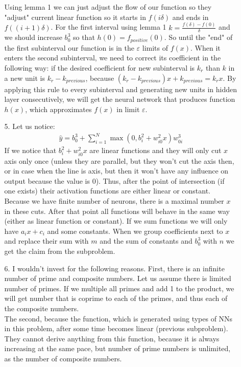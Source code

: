 \documentclass[10pt,a4paper]{article}
\begin{document}
\begin{enumerate}
\begin{enumerate}
Using lemma 1 we can just adjust the flow of our function so they "adjust" current linear function so it starts in $f(i\delta)$ and ends in $f((i+1)\delta)$.
For the first interval using lemma 1 $k = \frac{f(\delta) - f(0)}{\delta}$ and we should increase $b_0^3$ so that $h(0)=f_{positive}(0)$. So until the "end" of the first subinterval our function is in the $\varepsilon$ limits of $f(x)$. When it enters the second subinterval, we need to correct its coefficient in the following way:
if the desired coefficient for new subinterval is $k_r$ than $k$ in a new unit is $k_r - k_{previous}$, because 
$(k_r - k_{previous})x + k_{previous} = k_rx $. 
By applying this rule to every subinterval and generating new units in hidden layer consecutively, we will get the neural network that produces function $h(x)$, which approximates $f(x)$ in limit $\varepsilon$. 
\item[5.]
Let us notice:
\begin{align*}
\hat{y} = b_0^3 + \sum_{i=1}^N\max(0, b_i^2+w_{i0}^2x)w^3_{0i}
\end{align*}
If we notice that $ b_i^2+w_{i0}^2x$ are linear functions and they will only cut $x$ axis only once (unless they are parallel, but they won't cut the axis then, or in case when the line is axis, but then it won't have any influence on output because the value is 0). Thus, after the point of intersection (if one exists) their activation functions are either linear or constant. Because we have finite number of neurons, there is a maximal number $x$ in these cuts. After that point all functions will behave in the same way (either as linear function or constant). 
If we sum functions we will only have $a_ix + c_i$ and some constants. When we group coefficients next to $x$ and replace their sum with $m$ and the sum of constants and $b^3_0$ with $n$ we get the claim from the subproblem.
\item[6.]
I wouldn't invest for the following reasons. 
First, there is an infinite number of prime and composite numbers. Let us assume there is limited number of primes. If we multiple all primes and add 1 to the product, we will get number that is coprime to each of the primes, and thus each of the composite numbers. \\
The second, because the function, which is generated using types of NNs in this problem, after some time becomes linear (previous subproblem). They cannot derive anything from this function, because it is always increasing at the same pace, but number of prime numbers is unlimited, as the number of composite numbers.
\end{enumerate}
\end{enumerate}
\end{document}
